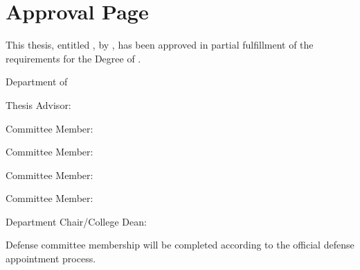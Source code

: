 \chapter*{Approval Page}

This thesis, entitled \textit{\thesistitle}, by \thesisauthor, has been approved in partial fulfillment of the requirements for the Degree of \degreeaward.

\vspace{0.8cm}

\noindent Department of \degreeprogram

\vspace{1.4cm}

\noindent\begin{minipage}{\textwidth}
Thesis Advisor:\hfill\makebox[0.5\textwidth]{\hrulefill}\\
\hspace*{0.5\textwidth}\supervisor

\vspace{0.95cm}

Committee Member:\hfill\makebox[0.5\textwidth]{\hrulefill}

\vspace{0.95cm}

Committee Member:\hfill\makebox[0.5\textwidth]{\hrulefill}

\vspace{0.95cm}

Committee Member:\hfill\makebox[0.5\textwidth]{\hrulefill}

\vspace{0.95cm}

Committee Member:\hfill\makebox[0.5\textwidth]{\hrulefill}

\vspace{0.95cm}

Department Chair/College Dean:\hfill\makebox[0.5\textwidth]{\hrulefill}\\
\hspace*{0.5\textwidth}\departmentchair
\end{minipage}

\vspace{1.4cm}

\noindent Defense committee membership will be completed according to the official defense appointment process.
